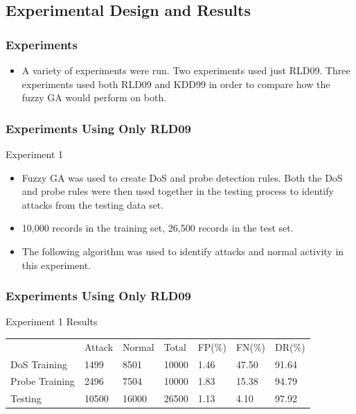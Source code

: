 \documentclass{beamer}
\begin{document}
\subsection{Experimental Design and Results}

\begin{frame}
	\frametitle{Experiments}
	\begin{itemize}
		\item A variety of experiments were run. Two experiments used just RLD09. Three experiments used both RLD09 and KDD99 in order to compare how the fuzzy GA would perform on both.
	\end{itemize}
\end{frame}


\begin{frame}
	\frametitle{Experiments Using Only RLD09}
	Experiment 1
	\begin{itemize}
		\item Fuzzy GA was used to create DoS and probe detection rules. Both the DoS and probe rules were then used together in the testing process to identify attacks from the testing data set.
		\item 10,000 records in the training set, 26,500 records in the test set.
	\end{itemize}


\begin{itemize}
	\item The following algorithm was used to identify attacks and normal activity in this experiment.
\end{itemize}

\begin{algorithmic}
\ELSE {}
\ENDIF
\end{algorithmic}
\end{frame}


\begin{frame}
	\frametitle{Experiments Using Only RLD09}
	Experiment 1 Results
\begin{table}
\begin{small}
\begin{tabular}{lllllll}
 & Attack & Normal & Total & FP(\%) & FN(\%) & DR(\%)\\
DoS Training & 1499 & 8501 & 10000 & 1.46 & 47.50 & 91.64\\
Probe Training & 2496 & 7504 & 10000 & 1.83 & 15.38 & 94.79\\
Testing & 10500 & 16000 & 26500 & 1.13 & 4.10 & 97.92\\
\end{tabular}
\end{small}
\end{table}
\end{frame}
\end{document}
